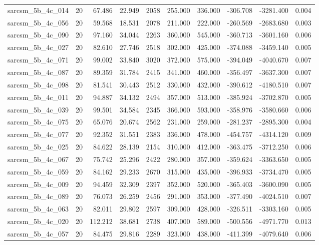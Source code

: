 \begin{tabular}{lrrrrrrrrr}
sarcsm\_5b\_4c\_014 & 20 & 67.486 & 22.949 & 2058 & 255.000 & 336.000 & -306.708 & -3281.400 & 0.004 \\
sarcsm\_5b\_4c\_056 & 20 & 59.568 & 18.531 & 2078 & 211.000 & 222.000 & -260.569 & -2683.680 & 0.003 \\
sarcsm\_5b\_4c\_090 & 20 & 97.160 & 34.044 & 2263 & 360.000 & 545.000 & -360.713 & -3601.160 & 0.006 \\
sarcsm\_5b\_4c\_027 & 20 & 82.610 & 27.746 & 2518 & 302.000 & 425.000 & -374.088 & -3459.140 & 0.005 \\
sarcsm\_5b\_4c\_071 & 20 & 99.002 & 33.840 & 3020 & 372.000 & 575.000 & -394.049 & -4040.670 & 0.007 \\
sarcsm\_5b\_4c\_087 & 20 & 89.359 & 31.784 & 2415 & 341.000 & 460.000 & -356.497 & -3637.300 & 0.007 \\
sarcsm\_5b\_4c\_098 & 20 & 81.541 & 30.443 & 2512 & 330.000 & 432.000 & -390.612 & -4180.510 & 0.007 \\
sarcsm\_5b\_4c\_011 & 20 & 94.887 & 34.132 & 2494 & 357.000 & 513.000 & -385.924 & -3702.870 & 0.005 \\
sarcsm\_5b\_4c\_039 & 20 & 99.501 & 34.584 & 2345 & 366.000 & 593.000 & -358.976 & -3580.660 & 0.006 \\
sarcsm\_5b\_4c\_075 & 20 & 65.076 & 20.674 & 2562 & 231.000 & 259.000 & -281.237 & -2895.300 & 0.004 \\
sarcsm\_5b\_4c\_077 & 20 & 92.352 & 31.551 & 2383 & 336.000 & 478.000 & -454.757 & -4314.120 & 0.009 \\
sarcsm\_5b\_4c\_025 & 20 & 84.622 & 28.139 & 2154 & 310.000 & 412.000 & -363.475 & -3712.250 & 0.006 \\
sarcsm\_5b\_4c\_067 & 20 & 75.742 & 25.296 & 2422 & 280.000 & 357.000 & -359.624 & -3363.650 & 0.005 \\
sarcsm\_5b\_4c\_059 & 20 & 84.162 & 29.233 & 2670 & 315.000 & 435.000 & -396.933 & -3734.470 & 0.005 \\
sarcsm\_5b\_4c\_009 & 20 & 94.459 & 32.309 & 2397 & 352.000 & 520.000 & -365.403 & -3600.090 & 0.005 \\
sarcsm\_5b\_4c\_089 & 20 & 76.073 & 26.259 & 2456 & 291.000 & 353.000 & -377.490 & -4024.510 & 0.007 \\
sarcsm\_5b\_4c\_063 & 20 & 82.011 & 29.802 & 2597 & 309.000 & 428.000 & -326.511 & -3303.160 & 0.005 \\
sarcsm\_5b\_4c\_020 & 20 & 112.212 & 38.681 & 2738 & 407.000 & 589.000 & -500.556 & -4971.770 & 0.013 \\
sarcsm\_5b\_4c\_057 & 20 & 84.475 & 29.816 & 2289 & 323.000 & 438.000 & -411.399 & -4079.640 & 0.006 \\

\end{tabular}
